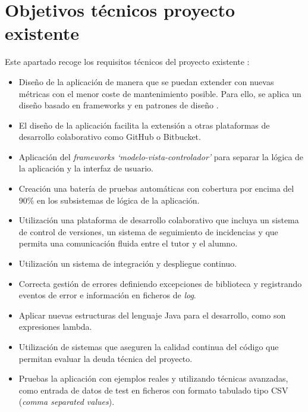 \section{Objetivos técnicos proyecto existente}
Este apartado recoge los requisitos técnicos del proyecto existente  \cite{TFGPrevio}:
\begin{itemize}
	\tightlist
	\item Diseño de la aplicación de manera que se puedan extender con nuevas métricas con el menor coste de mantenimiento posible. Para ello, se aplica un diseño basado en frameworks y en patrones de diseño \cite{gamma_patrones_2002}.
	\item El diseño de la aplicación facilita la extensión a otras plataformas de desarrollo colaborativo como GitHub o Bitbucket.
	\item Aplicación del \textit{frameworks `modelo-vista-controlador'} para separar la lógica de la aplicación y la interfaz de usuario.
	\item Creación una batería de pruebas automáticas con cobertura por encima del 90\% en los subsistemas de lógica de la aplicación.
	\item Utilización una plataforma de desarrollo colaborativo que incluya un sistema de control de versiones, un sistema de seguimiento de incidencias y que permita una comunicación fluida entre el tutor y el alumno.
	\item Utilización un sistema de integración y despliegue continuo.
	\item Correcta gestión de errores definiendo excepciones de biblioteca y registrando eventos de error e información en ficheros de \textit{log}. 
	\item Aplicar nuevas estructuras  del lenguaje Java para el desarrollo, como son expresiones lambda. 
	\item Utilización de sistemas que aseguren la calidad continua del código que permitan evaluar la deuda técnica del proyecto.
	\item Pruebas la aplicación con ejemplos reales y utilizando técnicas avanzadas, como entrada de datos de test en ficheros con formato tabulado tipo CSV (\textit{comma separated values}). 	
\end{itemize}

\newpage

